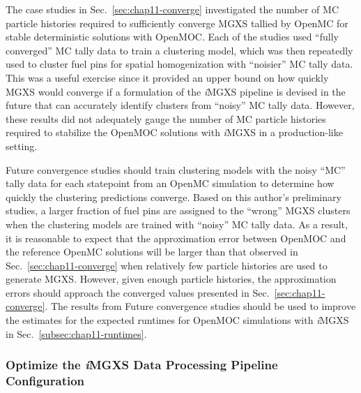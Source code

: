 The case studies in Sec.~\ref{sec:chap11-converge} investigated the number of \ac{MC} particle histories required to sufficiently converge \ac{MGXS} tallied by OpenMC for stable deterministic solutions with OpenMOC. Each of the studies used ``fully converged'' \ac{MC} tally data to train a clustering model, which was then repeatedly used to cluster fuel pins for spatial homogenization with ``noisier'' \ac{MC} tally data. This was a useful exercise since it provided an upper bound on how quickly \ac{MGXS} would converge if a formulation of the \textit{i}\ac{MGXS} pipeline is devised in the future that can accurately identify clusters from ``noisy'' \ac{MC} tally data. However, these results did not adequately gauge the number of \ac{MC} particle histories required to stabilize the OpenMOC solutions with \textit{i}\ac{MGXS} in a production-like setting.

Future convergence studies should train clustering models with the noisy ``MC'' tally data for each statepoint from an OpenMC simulation to determine how quickly the clustering predictions converge. Based on this author's preliminary studies, a larger fraction of fuel pins are assigned to the ``wrong'' \ac{MGXS} clusters when the clustering models are trained with ``noisy'' \ac{MC} tally data. As a result, it is reasonable to expect that the approximation error between OpenMOC and the reference OpenMC solutions will be larger than that observed in Sec.~\ref{sec:chap11-converge} when relatively few particle histories are used to generate \ac{MGXS}. However, given enough particle histories, the approximation errors should approach the converged values presented in Sec.~\ref{sec:chap11-converge}. The results from Future convergence studies should be used to improve the estimates for the expected runtimes for OpenMOC simulations with \textit{i}\ac{MGXS} in Sec.~\ref{subsec:chap11-runtimes}.


\subsubsection{Optimize the \textit{i}MGXS Data Processing Pipeline Configuration}
\label{subsubsec:chap12-optimize-imgxs}

